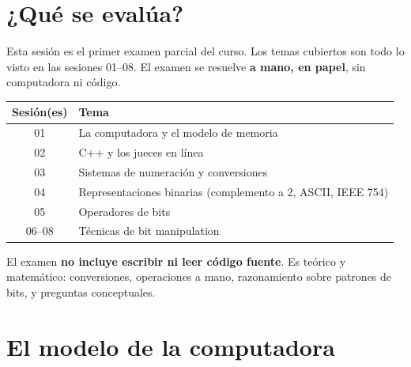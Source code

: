 \documentclass[12pt, oneside]{article}
\begin{document}

\tableofcontents
\newpage

\section{¿Qué se evalúa?}

Esta sesión es el primer examen parcial del curso.
Los temas cubiertos son todo lo visto en las sesiones 01–08.
El examen se resuelve \textbf{a mano, en papel}, sin computadora ni código.

\begin{center}
\begin{tabular}{cl}
  \toprule
  \textbf{Sesión(es)} & \textbf{Tema} \\
  \midrule
  01    & La computadora y el modelo de memoria \\
  02    & C++ y los jueces en línea \\
  03    & Sistemas de numeración y conversiones \\
  04    & Representaciones binarias (complemento a 2, ASCII, IEEE 754) \\
  05    & Operadores de bits \\
  06--08 & Técnicas de bit manipulation \\
  \bottomrule
\end{tabular}
\end{center}

\begin{recuerda}
  El examen \textbf{no incluye escribir ni leer código fuente}.
  Es teórico y matemático: conversiones, operaciones a mano, razonamiento
  sobre patrones de bits, y preguntas conceptuales.
\end{recuerda}

\newpage

\section{El modelo de la computadora}
\end{document}
